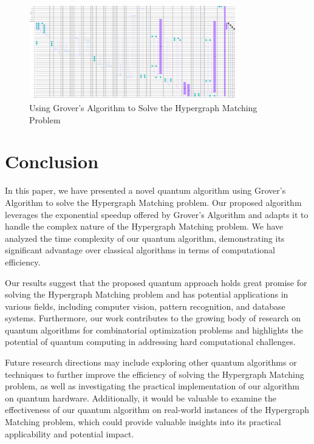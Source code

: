 \begin{figure}[htp]
    \centering
    \includegraphics[width=9cm]{Figures/Hypergraph_Matching_circuit.png}
    \caption{Using Grover's Algorithm to Solve the Hypergraph Matching Problem}
    \label{fig:Hypergraph_Matching}
\end{figure}

\section{Conclusion}\label{sec:conclusion}

In this paper, we have presented a novel quantum algorithm using Grover's Algorithm to solve the Hypergraph Matching problem. Our proposed algorithm leverages the exponential speedup offered by Grover's Algorithm and adapts it to handle the complex nature of the Hypergraph Matching problem. We have analyzed the time complexity of our quantum algorithm, demonstrating its significant advantage over classical algorithms in terms of computational efficiency.

Our results suggest that the proposed quantum approach holds great promise for solving the Hypergraph Matching problem and has potential applications in various fields, including computer vision, pattern recognition, and database systems. Furthermore, our work contributes to the growing body of research on quantum algorithms for combinatorial optimization problems and highlights the potential of quantum computing in addressing hard computational challenges.

Future research directions may include exploring other quantum algorithms or techniques to further improve the efficiency of solving the Hypergraph Matching problem, as well as investigating the practical implementation of our algorithm on quantum hardware. Additionally, it would be valuable to examine the effectiveness of our quantum algorithm on real-world instances of the Hypergraph Matching problem, which could provide valuable insights into its practical applicability and potential impact.

